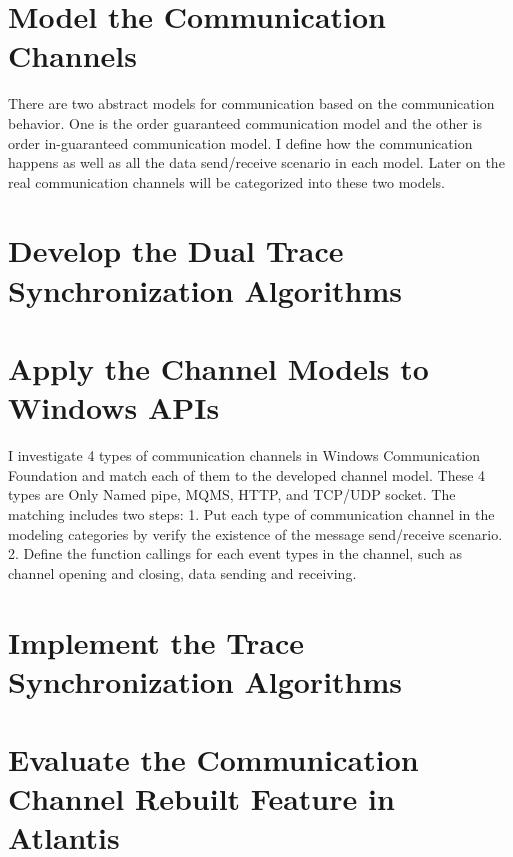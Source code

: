 \section{Model the Communication Channels}
There are two abstract models for communication based on the communication behavior. One is the order guaranteed communication model and the other is order in-guaranteed communication model. I define  how the communication happens as well as all the data send/receive scenario in each model. Later on the real communication channels will be categorized into these two models. 


\section{Develop the Dual Trace Synchronization Algorithms}


\section{Apply the Channel Models to Windows APIs}
I investigate 4 types of communication channels in Windows Communication Foundation and match each of them to the developed channel model. These 4 types are Only Named pipe, MQMS, HTTP, and TCP/UDP socket. The matching includes two steps: 1. Put each type of communication channel in the modeling categories by verify the existence of the message send/receive scenario. 2. Define the function callings for each event types in the channel, such as channel opening and closing, data sending and receiving. 

\section{Implement the Trace Synchronization Algorithms}

\section{Evaluate the Communication Channel Rebuilt Feature in Atlantis}



\setlength{\unitlength}{\savedunitlength}
